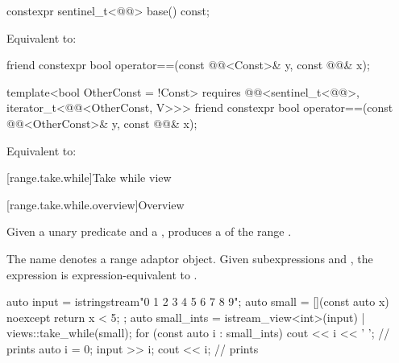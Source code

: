 %
\begin{itemdecl}
constexpr sentinel_t<@@> base() const;
\end{itemdecl}

\begin{itemdescr}
\pnum
\effects
Equivalent to: 
\end{itemdescr}

%
\begin{itemdecl}
friend constexpr bool operator==(const @@<Const>& y, const @@& x);

template<bool OtherConst = !Const>
  requires @@<sentinel_t<@@>, iterator_t<@@<OtherConst, V>>>
friend constexpr bool operator==(const @@<OtherConst>& y, const @@& x);
\end{itemdecl}

\begin{itemdescr}
\pnum
\effects
Equivalent to:
\end{itemdescr}

[range.take.while]{Take while view}

[range.take.while.overview]{Overview}

\pnum
Given a unary predicate  and a  ,
 produces a 
of the range .

%
\pnum
{}%
The name  denotes
a range adaptor object.
Given subexpressions  and ,
the expression 
is expression-equivalent to .

\pnum
\begin{example}
\begin{codeblock}
auto input = istringstream{"0 1 2 3 4 5 6 7 8 9"};
auto small = [](const auto x) noexcept { return x < 5; };
auto small_ints = istream_view<int>(input) | views::take_while(small);
for (const auto i : small_ints) {
  cout << i << ' ';                             // prints 
}
auto i = 0;
input >> i;
cout << i;                                      // prints 
\end{codeblock}
\end{example}

